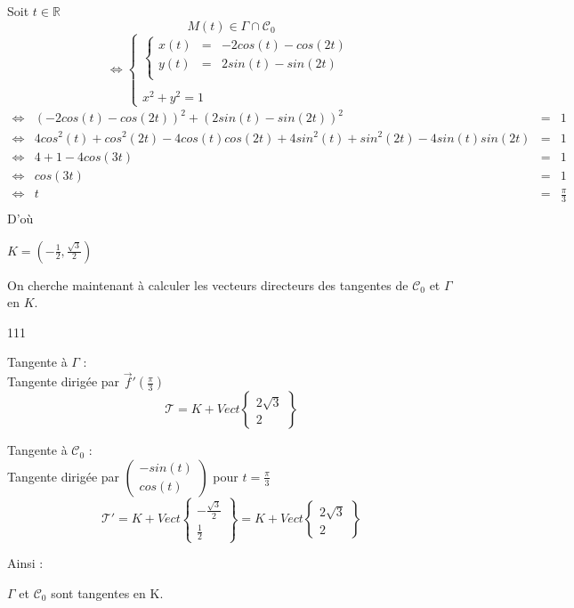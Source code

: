 Soit $t\in\mathbb{R}$\\
\[
  M(t) \in \Gamma\cap\mathcal{C}_0
\]
\[
  \iff
  \left\{
  \begin{array}{l}
    \left\{
    \begin{array}{rcl}
      x(t) & = & -2cos(t)-cos(2t) \\
      y(t) & = & 2sin(t)-sin(2t)  \\
    \end{array}
    \right. \\\\
    x^2+y^2=1
  \end{array}
  \right.
\]
\[
  \begin{array}{crcl}
    \iff & (-2cos(t)-cos(2t))^2+ (2sin(t)-sin(2t))^2                             & = & 1             \\
    \iff & 4cos^2(t)+cos^2(2t)-4cos(t)cos(2t)+4sin^2(t)+sin^2(2t)-4sin(t)sin(2t) & = & 1             \\
    \iff & 4 + 1 - 4cos(3t)                                                      & = & 1             \\
    \iff & cos(3t)                                                               & = & 1             \\
    \iff & t                                                                     & = & \frac{\pi}{3} \\
  \end{array}
\]
D'où
\begin{result}
  $
    K =
    \left(
    -\frac{1}{2},
    \frac{\sqrt{3}}{2}
    \right)
  $
\end{result}
On cherche maintenant à calculer les vecteurs directeurs des tangentes de $\mathcal{C}_0$ et $\Gamma$ en $K$.
\begin{dinglist}{111}
  \item Tangente à $\Gamma$ :\\
  Tangente dirigée par $\overrightarrow{f}'\left(\frac{\pi}{3}\right)$
  \[
    \mathcal{T} = K + Vect
    \left\{
    \begin{array}{c}
      2\sqrt{3} \\
      2
    \end{array}
    \right\}
  \]
  \item Tangente à $\mathcal{C}_0$ :\\
  Tangente dirigée par
  $
    \left(
    \begin{array}{c}
        -sin(t) \\
        cos(t)
      \end{array}
    \right)
  $ pour $t = \frac{\pi}{3}$
  \[
    \mathcal{T}' = K + Vect
    \left\{
    \begin{array}{c}
      -\frac{\sqrt{3}}{2} \\
      \frac{1}{2}
    \end{array}
    \right\} = K + Vect
    \left\{
    \begin{array}{c}
      2\sqrt{3} \\
      2
    \end{array}
    \right\}
  \]
\end{dinglist}
Ainsi :
\begin{result}
  $\Gamma$ et $\mathcal{C}_0$ sont tangentes en K.
\end{result}
